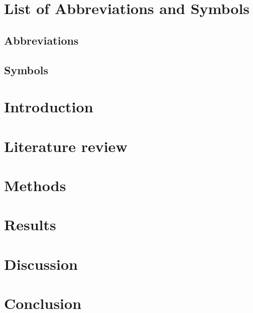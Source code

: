 \documentclass[a4paper,master=mai,masteroption=ecs,english]{kulemt}
\begin{document}
\begin{preface}

\end{preface}
\tableofcontents*
\begin{abstract}

\end{abstract}
\listoffiguresandtables
\chapter{List of Abbreviations and Symbols}
\section*{Abbreviations}

\section*{Symbols}
\mainmatter
\chapter{Introduction}

\chapter{Literature review}

\chapter{Methods}

\chapter{Results}

\chapter{Discussion}

\chapter{Conclusion}

\appendixpage*
\appendix


% 
\backmatter


\end{document}
